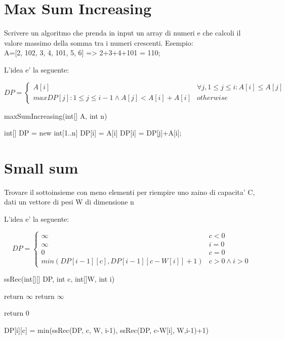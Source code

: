 \documentclass[oneside]{book}
\begin{document}
\section{Max Sum Increasing}
Scrivere un algoritmo che prenda in input un array di numeri e che calcoli il valore massimo della somma tra i numeri crescenti. Esempio:\\
A=[2, 102, 3, 4, 101, 5, 6] => 2+3+4+101 = 110;

L'idea e' la seguente:

\begin{equation}
  DP =
    \begin{cases}
      A[i] & \forall j, 1 \leq j \leq i : A[i] \leq A[j]\\
      max{DP[j]: 1 \leq j \leq i-1 \land A[j] < A[i]}+A[i] & otherwise      
    \end{cases}       
\end{equation}
\begin{algorithm}
\caption{maxSumIncreasing(int[] A, int n)\label{alg:cap}}
\begin{algorithmic}
\State int[] DP = new int[1..n]
	\State DP[i] = A[i]
			\State DP[i] = DP[j]+A[i];
		\EndIf
	\EndFor

\EndFor
\end{algorithmic}
\end{algorithm}
\newpage
\section{Small sum}
Trovare il sottoinsieme con meno elementi per riempire uno zaino di capacita' C, dati un vettore di pesi W di dimensione n

L'idea e' la seguente:

\begin{equation}
DP = 
	\begin{cases}
		\infty & c < 0 \\
		\infty & i = 0\\
		0 & c = 0 \\
		min(DP[i-1][c],DP[i-1][c-W[i]]+1) & c > 0 \land i > 0
	\end{cases}
\end{equation}

\begin{algorithm}
\caption{ssRec(int[][] DP, int c, int[]W, int i)\label{alg:cap}}
\begin{algorithmic}
	\State return $\infty$
	\State return $\infty$

	\State return 0

\Else
		\State DP[i][c] = min(ssRec(DP, c, W, i-1), ssRec(DP, c-W[i], W,i-1)+1)
	\EndIf
\EndIf
\end{algorithmic}
\end{algorithm}
\end{document}
